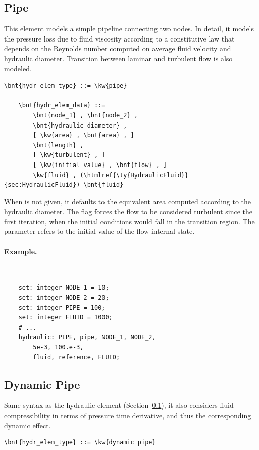 \subsection{Pipe}
\label{sec:EL:HYDR:PIPE}
This element models a simple pipeline connecting two  nodes.
In detail, it models the pressure loss due to fluid viscosity
according to a constitutive law that depends on the Reynolds number
computed on average fluid velocity and hydraulic diameter.
Transition between laminar and turbulent flow is also modeled.
\begin{Verbatim}[commandchars=\\\{\}]
    \bnt{hydr_elem_type} ::= \kw{pipe}

    \bnt{hydr_elem_data} ::=
        \bnt{node_1} , \bnt{node_2} ,
        \bnt{hydraulic_diameter} ,
        [ \kw{area} , \bnt{area} , ]
        \bnt{length} ,
        [ \kw{turbulent} , ]
        [ \kw{initial value} , \bnt{flow} , ]
        \kw{fluid} , (\htmlref{\ty{HydraulicFluid}}{sec:HydraulicFluid}) \bnt{fluid}
\end{Verbatim}
When  is not given, it defaults to the equivalent area
computed according to the hydraulic diameter.
The flag  forces the flow to be considered turbulent
since the first iteration, when the initial conditions would fall
in the transition region.
The  parameter refers to the initial value
of the flow internal state.

\paragraph{Example.} \
\begin{verbatim}
    set: integer NODE_1 = 10;
    set: integer NODE_2 = 20;
    set: integer PIPE = 100;
    set: integer FLUID = 1000;
    # ...
    hydraulic: PIPE, pipe, NODE_1, NODE_2,
        5e-3, 100.e-3,
        fluid, reference, FLUID;
\end{verbatim}



\subsection{Dynamic Pipe}
\label{sec:EL:HYDR:DYNAMIC_PIPE}
Same syntax as the  hydraulic element
(Section~\ref{sec:EL:HYDR:PIPE}),
it also considers fluid compressibility in terms of pressure time derivative,
and thus the corresponding dynamic effect.
\begin{Verbatim}[commandchars=\\\{\}]
    \bnt{hydr_elem_type} ::= \kw{dynamic pipe}
\end{Verbatim}

